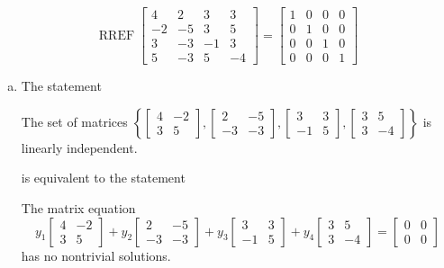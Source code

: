 \begin{exerciseAnswer} 


\[\operatorname{RREF} \left[\begin{array}{cccc}
4 & 2 & 3 & 3 \\
-2 & -5 & 3 & 5 \\
3 & -3 & -1 & 3 \\
5 & -3 & 5 & -4
\end{array}\right] = \left[\begin{array}{cccc}
1 & 0 & 0 & 0 \\
0 & 1 & 0 & 0 \\
0 & 0 & 1 & 0 \\
0 & 0 & 0 & 1
\end{array}\right] \]


\begin{enumerate}[(a)]
\item The statement 
\begin{center}\begin{minipage}{0.8\textwidth}
 The set of matrices \( \left\{ \left[\begin{array}{cc}
4 & -2 \\
3 & 5
\end{array}\right] , \left[\begin{array}{cc}
2 & -5 \\
-3 & -3
\end{array}\right] , \left[\begin{array}{cc}
3 & 3 \\
-1 & 5
\end{array}\right] , \left[\begin{array}{cc}
3 & 5 \\
3 & -4
\end{array}\right] \right\} \) is linearly independent.
\end{minipage}\end{center}
     is equivalent to the statement 
\begin{center}\begin{minipage}{0.8\textwidth}
 The matrix equation \[ y_{1} \left[\begin{array}{cc}
4 & -2 \\
3 & 5
\end{array}\right] + y_{2} \left[\begin{array}{cc}
2 & -5 \\
-3 & -3
\end{array}\right] + y_{3} \left[\begin{array}{cc}
3 & 3 \\
-1 & 5
\end{array}\right] + y_{4} \left[\begin{array}{cc}
3 & 5 \\
3 & -4
\end{array}\right] = \left[\begin{array}{cc}
0 & 0 \\
0 & 0
\end{array}\right] \] has no nontrivial solutions. 
\end{minipage}\end{center}
    

\end{enumerate}
\end{exerciseAnswer}
